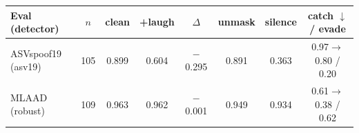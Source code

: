 \begin{tabular}{lccccccc}
\toprule
Eval (detector) & $n$ & clean & +laugh & $\Delta$ & unmask & silence & catch $\downarrow$ / evade \\
\midrule
ASVspoof19 (asv19) & 105 & 0.899 & 0.604 & $-$0.295 & 0.891 & 0.363 & 0.97$\to$0.80 / 0.20 \\
MLAAD (robust) & 109 & 0.963 & 0.962 & $-$0.001 & 0.949 & 0.934 & 0.61$\to$0.38 / 0.62 \\
\bottomrule
\end{tabular}